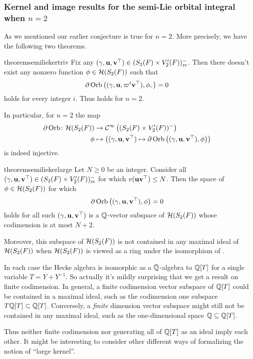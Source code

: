\subsubsection{Kernel and image results for the semi-Lie orbital integral when $n=2$}
As we mentioned our earlier conjecture 
is true for $n = 2$.
More precisely, we have the following two theorems.

\begin{restatable}{theorem}{semiliekertriv}
  \label{thm:semi_lie_ker_trivial}
  Fix any ${(\gamma, \mathbf u, \mathbf v^\top)} \in (S_2(F) \times V'_2(F))_{\mathrm{rs}}^-$.
  Then there doesn't exist any nonzero function $\phi \in \mathcal H(S_2(F))$ such that
  \[ \partial \operatorname{Orb} \left( (\gamma, \mathbf u, \varpi^i \mathbf v^\top), \phi, \right) = 0 \]
  holds for every integer $i$.
  Thus  holds for $n = 2$.
\end{restatable}

In particular, for $n=2$ the map
\begin{align*}
  \partial\operatorname{Orb} \colon \mathcal H(S_2(F)) &\to \mathcal{C}^\infty\left( (S_2(F) \times V'_2(F))^- \right) \\
  \phi &\mapsto \left( {(\gamma, \mathbf u, \mathbf v^\top)} \mapsto \partial \operatorname{Orb} \left({(\gamma, \mathbf u, \mathbf v^\top)}, \phi \right) \right)
\end{align*}
is indeed injective.

\begin{restatable}{theorem}{semiliekerlarge}
  \label{thm:semi_lie_ker_huge}
  Let $N \ge 0$ be an integer.
  Consider all ${(\gamma, \mathbf u, \mathbf v^\top)} \in (S_2(F) \times V'_2(F))_{\mathrm{rs}}^-$ for which $v(\mathbf u\mathbf v^\top) \le N$.
  Then the space of $\phi \in \mathcal H(S_2(F))$ for which
  \[ \partial \operatorname{Orb} \left( {(\gamma, \mathbf u, \mathbf v^\top)}, \phi \right) = 0 \]
  holds for all such ${(\gamma, \mathbf u, \mathbf v^\top)}$ is a $\mathbb Q$-vector subspace of $\mathcal H(S_2(F))$
  whose codimension is at most $N + 2$.

  Moreover, this subspace of $\mathcal H(S_2(F))$
  is not contained in any maximal ideal of $\mathcal H(S_2(F))$
  when $\mathcal H(S_2(F))$ is viewed as a ring under the isomorphism of .
\end{restatable}

\begin{remark}
  In each case the Hecke algebra is isomorphic as a $\mathbb Q$-algebra to $\mathbb Q[T]$
  for a single variable $T = Y+Y^{-1}$.
  So actually it's mildly surprising that we get a result on finite codimension.
  In general, a finite codimension vector subspace of $\mathbb Q[T]$ could
  be contained in a maximal ideal,
  such as the codimension one subspace $T \mathbb Q[T] \subset \mathbb Q[T]$.
  Conversely, a \emph{finite} dimension vector subspace might still
  not be contained in any maximal ideal,
  such as the one-dimensional space $\mathbb Q \subseteq \mathbb Q[T]$.

  Thus neither finite codimension nor generating all of $\mathbb Q[T]$ as an ideal imply each other.
  It might be interesting to consider other different ways
  of formalizing the notion of ``large kernel''.
\end{remark}

